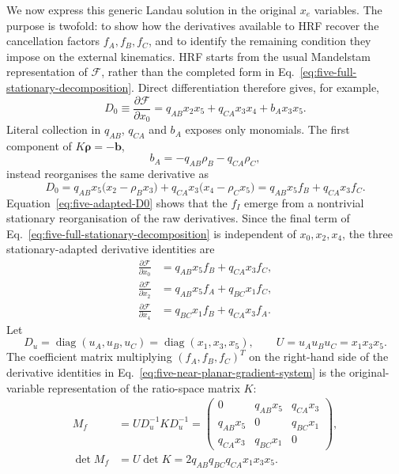 \documentclass[a4paper,11pt]{article}
\begin{document}
We now express this generic Landau solution in the original \(x_e\)
variables.  The purpose is twofold: to show how the derivatives available to
HRF recover the cancellation factors \(f_A,f_B,f_C\), and to identify the
remaining condition they impose on the external kinematics.  HRF starts
from the usual Mandelstam representation of \(\mathcal F\), rather than the
completed form in Eq.~\eqref{eq:five-full-stationary-decomposition}.  Direct
differentiation therefore gives, for example,
\begin{equation}
 D_0\equiv\frac{\partial\mathcal F}{\partial x_0}
 =q_{AB}x_2x_5+q_{CA}x_3x_4+b_Ax_3x_5.
 \label{eq:five-raw-D0}
\end{equation}
Literal collection in \(q_{AB}\), \(q_{CA}\) and \(b_A\) exposes only
monomials.  The first component of \(K\boldsymbol\rho=-\boldsymbol b\),
\begin{equation}
 b_A=-q_{AB}\rho_B-q_{CA}\rho_C,
\end{equation}
instead reorganises the same derivative as
\begin{equation}
 D_0=q_{AB}x_5\bigl(x_2-\rho_Bx_3\bigr)
     +q_{CA}x_3\bigl(x_4-\rho_Cx_5\bigr)
 =q_{AB}x_5f_B+q_{CA}x_3f_C.
 \label{eq:five-adapted-D0}
\end{equation}
Equation~\eqref{eq:five-adapted-D0} shows that the \(f_I\) emerge from a
nontrivial stationary reorganisation of the raw derivatives.  Since the
final term of Eq.~\eqref{eq:five-full-stationary-decomposition} is independent
of \(x_0,x_2,x_4\), the three stationary-adapted derivative identities are
\begin{align}
 \frac{\partial\mathcal F}{\partial x_0}
 &=q_{AB}x_5f_B+q_{CA}x_3f_C,\nonumber\\
 \frac{\partial\mathcal F}{\partial x_2}
 &=q_{AB}x_5f_A+q_{BC}x_1f_C,\nonumber\\
 \frac{\partial\mathcal F}{\partial x_4}
 &=q_{BC}x_1f_B+q_{CA}x_3f_A.
 \label{eq:five-near-planar-gradient-system}
\end{align}
Let
\[
 D_u=\operatorname{diag}(u_A,u_B,u_C)
 =\operatorname{diag}(x_1,x_3,x_5),
 \qquad U=u_Au_Bu_C=x_1x_3x_5.
\]
The coefficient matrix multiplying \((f_A,f_B,f_C)^T\) on the right-hand
side of the derivative identities in
Eq.~\eqref{eq:five-near-planar-gradient-system} is the original-variable
representation of the ratio-space matrix \(K\):
\begin{align}
 M_f&=U D_u^{-1}KD_u^{-1}
 =\begin{pmatrix}
 0&q_{AB}x_5&q_{CA}x_3\\
 q_{AB}x_5&0&q_{BC}x_1\\
 q_{CA}x_3&q_{BC}x_1&0
 \end{pmatrix},\nonumber\\
 \det M_f&=U\det K
 =2q_{AB}q_{BC}q_{CA}x_1x_3x_5.
 \label{eq:five-near-planar-normal-matrix}
\end{align}
\end{document}

